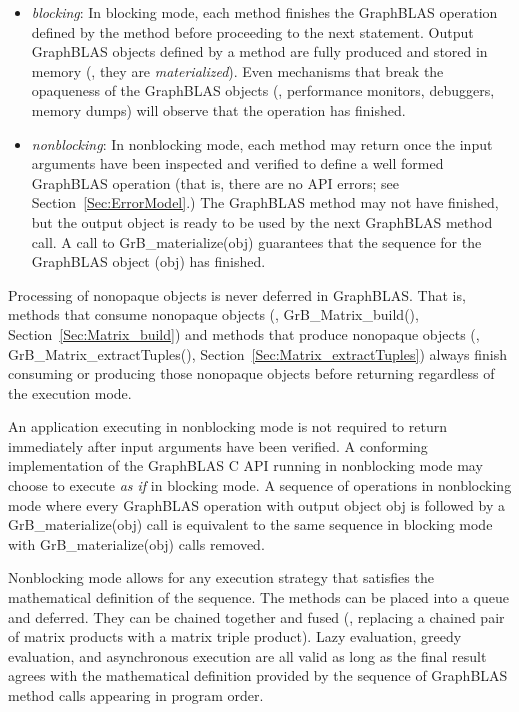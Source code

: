 \begin{itemize}

\item \emph{blocking}: In blocking mode, each method finishes the
GraphBLAS operation defined by the method before proceeding to the
next statement.
Output GraphBLAS objects defined
by a method are fully produced and stored in  memory (\ie, they are
\emph{materialized}).  Even mechanisms that break the opaqueness of the
GraphBLAS objects (\eg, performance monitors, debuggers, memory dumps)
will observe that the operation has finished.

\item \emph{nonblocking}: In nonblocking mode, each method may return
once the input arguments have been inspected and verified to define
a well formed GraphBLAS operation (that is, there are no API errors;
see Section~\ref{Sec:ErrorModel}.) The GraphBLAS method may not have
finished, but the output object is ready to be used by the next GraphBLAS
method call.  A call to {\sf GrB\_materialize(obj)} guarantees that
the sequence for the GraphBLAS object ({\sf obj}) has finished.

\end{itemize}

Processing of nonopaque objects is never deferred in
GraphBLAS. That is, methods that consume nonopaque objects (\eg, {\sf
GrB\_Matrix\_build()}, Section~\ref{Sec:Matrix_build}) and methods that
produce nonopaque objects (\eg, {\sf GrB\_Matrix\_extractTuples()},
Section~\ref{Sec:Matrix_extractTuples}) always finish consuming or
producing those nonopaque objects before returning regardless of the 
execution mode.

An application executing in nonblocking mode is not required to return
immediately after input arguments have been verified. A conforming
implementation of the GraphBLAS C API running in nonblocking mode may
choose to execute {\it as if} in blocking mode.  A sequence of operations
in nonblocking mode where every GraphBLAS operation with output object
{\sf obj} is followed by a {\sf GrB\_materialize(obj)} call is equivalent to the
same sequence in blocking mode with {\sf GrB\_materialize(obj)} calls removed.

Nonblocking mode allows for any execution strategy that satisfies the
mathematical definition of the sequence.  The methods can be placed
into a queue and deferred.  They can be chained together and fused
(\eg, replacing a chained pair of matrix products with a matrix triple
product).  Lazy evaluation, greedy evaluation, and asynchronous execution
are all valid as long as the final result agrees with the mathematical
definition provided by the sequence of GraphBLAS method calls appearing
in  program order.

